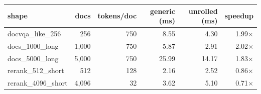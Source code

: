 \begin{tabular}{l r r r r r}
\toprule
shape & docs & tokens/doc & generic (ms) & unrolled (ms) & speedup \\
\midrule
docvqa\_like\_256 & 256 & 750 & 8.55 & 4.30 & 1.99$\times$ \\
docs\_1000\_long & 1,000 & 750 & 5.87 & 2.91 & 2.02$\times$ \\
docs\_5000\_long & 5,000 & 750 & 25.99 & 14.17 & 1.83$\times$ \\
rerank\_512\_short & 512 & 128 & 2.16 & 2.52 & 0.86$\times$ \\
rerank\_4096\_short & 4,096 & 32 & 3.62 & 5.10 & 0.71$\times$ \\
\bottomrule
\end{tabular}
